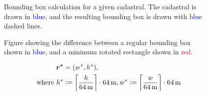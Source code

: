 \begin{figure}[H]
  \centering
  
  \caption{
    Bounding box calculation for a given cadastral.
    The cadastral is drawn in \textcolor{blue}{blue},
    and the resulting bounding box is drawn with \textcolor{blue}{blue} dashed lines.
  }
  \label{fig:cadastral_bbox}
\end{figure}

\begin{figure}[H]
  \centering
  
  \caption{
    Figure showing the difference between a regular bounding box shown in
    \textcolor{blue}{blue}, and a minimum rotated rectangle shown in
    \textcolor{red}{red}.
  }
  \label{fig:bbox_method}
\end{figure}


\begin{align*}
  \boldsymbol{r^*} &= (w^*, h^*),
  \\
  \text{ where }
  h^* &:= \left\lceil \frac{h}{\SI{64}{\meter}} \right\rceil \cdot \SI{64}{\meter},
  w^* := \left\lceil \frac{w}{\SI{64}{\meter}} \right\rceil \cdot \SI{64}{\meter}
\end{align*}

\begin{figure}[H]
  \centering
  
\end{figure}
